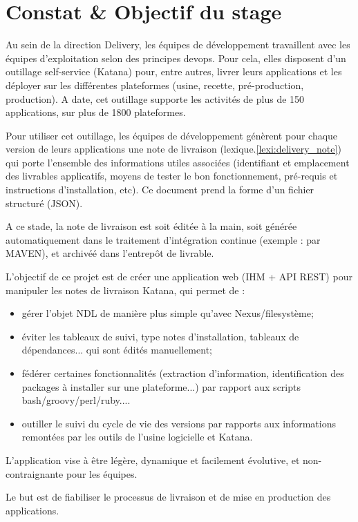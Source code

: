 \section{Constat \& Objectif du stage}
Au sein de la direction Delivery, les équipes de développement travaillent avec les équipes d’exploitation selon des principes devops.
Pour cela, elles disposent d’un outillage self-service (Katana) pour, entre autres,
livrer leurs applications et les déployer sur les différentes plateformes (usine, recette, pré-production, production).
A date, cet outillage supporte les activités de plus de 150 applications, sur plus de 1800 plateformes.

Pour utiliser cet outillage,
les équipes de développement génèrent pour chaque version de leurs applications une note de livraison (lexique.\ref{lexi:delivery_note}) qui porte l’ensemble des informations utiles associées
(identifiant et emplacement des livrables applicatifs, moyens de tester le bon fonctionnement, pré-requis et instructions d’installation, etc).
Ce document prend la forme d’un fichier structuré (JSON).

A ce stade, la note de livraison est soit éditée à la main, soit générée automatiquement dans le traitement d'intégration continue (exemple : par MAVEN), et archivéé dans l'entrepôt de livrable.

L'objectif de ce projet est de créer une application web (IHM + API REST) pour manipuler les notes de livraison Katana, qui permet de :

\begin{itemize}
 \item gérer l'objet NDL de manière plus simple qu'avec Nexus/filesystème;
 \item éviter les tableaux de suivi, type notes d'installation, tableaux de dépendances... qui sont édités manuellement;
 \item fédérer certaines fonctionnalités (extraction d'information, identification des packages à installer sur une plateforme...) par rapport aux scripts bash/groovy/perl/ruby....
 \item outiller le suivi du cycle de vie des versions par rapports aux informations remontées par les outils de l'usine logicielle et Katana.
\end{itemize}

L’application vise à être légère, dynamique et facilement évolutive, et non-contraignante pour les équipes.

Le but est de fiabiliser le processus de livraison et de mise en production des applications.

